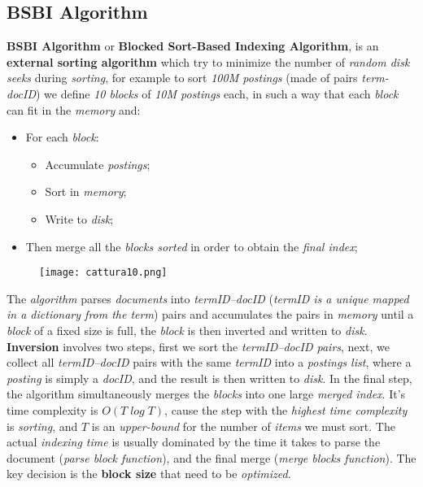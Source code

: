 \documentclass{article}
\begin{document}
\subsection{BSBI Algorithm}
\textbf{BSBI Algorithm} or \textbf{Blocked Sort-Based Indexing Algorithm}, is an \textbf{external sorting algorithm} which try to minimize the number of \emph{random disk seeks }during \emph{sorting}, for example to sort \emph{100M postings} (made of pairs \emph{term-docID}) we define \emph{10 blocks} of \emph{10M postings} each, in such a way that each \emph{block} can fit in the \emph{memory} and:
\begin{itemize}
\item For each \emph{block}:
\begin{itemize}
\item Accumulate \emph{postings};
\item Sort in \emph{memory};
\item Write to \emph{disk};
\end{itemize}
\item Then merge all the \emph{blocks sorted} in order to obtain the \emph{final index};
\end{itemize}
\clearpage
 \begin{figure}[H]
  \centering
  \texttt{[image: cattura10.png]}
\end{figure}
The \emph{algorithm} parses \emph{documents} into \emph{termID–docID} (\emph{termID is a unique mapped in a dictionary from the term}) pairs and accumulates the pairs in \emph{memory} until a \emph{block} of a fixed size is full, the \emph{block} is then inverted and written to \emph{disk}. \textbf{Inversion} involves two steps, first we sort the \emph{termID–docID pairs}, next, we collect all \emph{termID–docID} pairs with the same \emph{termID} into a \emph{postings list}, where a \emph{posting} is simply a \emph{docID}, and the result is then written to \emph{disk}. In the final step, the algorithm simultaneously merges the \emph{blocks} into one large \emph{merged index}. It's time complexity is $O(T\; log\;T)$, cause the step with the \emph{highest time complexity} is \emph{sorting}, and $T$ is an \emph{upper-bound} for the number of \emph{items} we must sort. The actual \emph{indexing time} is usually dominated by the time it takes to parse the document (\emph{parse block function}), and the final merge (\emph{merge blocks function}). The key decision is the \textbf{block size} that need to be \emph{optimized}. 
\end{document}
